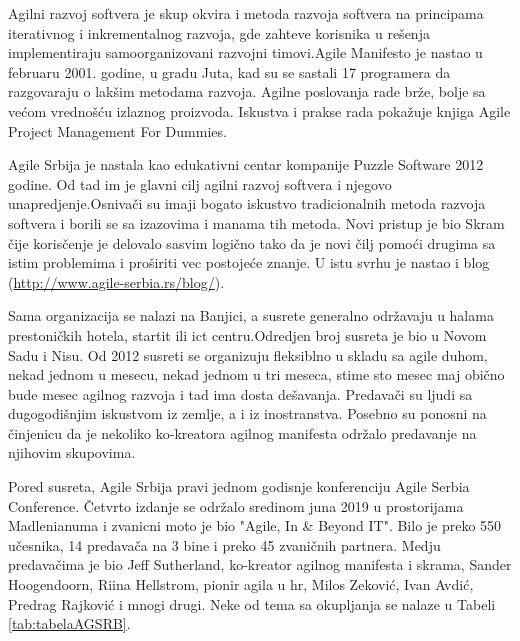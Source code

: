 \documentclass[a4paper]{article}
\begin{document}
{Agilni razvoj softvera je skup okvira i metoda razvoja softvera na principama iterativnog i inkrementalnog razvoja, gde zahteve korisnika u rešenja implementiraju samoorganizovani razvojni timovi.Agile Manifesto je nastao u februaru 2001. godine, u gradu Juta, kad su se sastali 17 programera da razgovaraju o lakšim metodama razvoja. \cite{agileManifes} Agilne poslovanja rade brže, bolje sa većom vrednošću izlaznog proizvoda. Iskustva i prakse rada pokažuje knjiga Agile Project Management For Dummies. \cite{agilebook} 

Agile Srbija je nastala kao edukativni centar kompanije Puzzle Software 2012 godine. Od tad im je glavni cilj agilni razvoj softvera i njegovo unapredjenje.Osnivači su imaji bogato iskustvo tradicionalnih metoda razvoja softvera i borili se sa izazovima i manama tih metoda. Novi pristup je bio Skram čije korisčenje je delovalo sasvim logično tako da je novi čilj pomoći drugima sa istim problemima i proširiti vec postojeće znanje. U istu svrhu je nastao i blog (\url{http://www.agile-serbia.rs/blog/}).

Sama organizacija se nalazi na Banjici, a susrete generalno održavaju u halama prestoničkih hotela, startit ili ict centru.Odredjen broj susreta je bio u Novom Sadu i Nisu. Od 2012 susreti se organizuju fleksiblno u skladu sa agile duhom, nekad jednom u mesecu, nekad jednom u tri meseca, stime sto mesec maj obično bude mesec agilnog razvoja i tad ima dosta dešavanja. Predavači su ljudi sa dugogodišnjim iskustvom iz zemlje, a i iz inostranstva. Posebno su ponosni na činjenicu da je nekoliko ko-kreatora agilnog manifesta održalo predavanje na njihovim skupovima. 

Pored susreta, Agile Srbija pravi jednom godisnje konferenciju Agile Serbia Conference. Četvrto izdanje se održalo sredinom juna 2019 u prostorijama Madlenianuma i zvanicni moto je bio "Agile, In \& Beyond IT". Bilo je preko 550 učesnika, 14 predavača na 3 bine i preko 45 zvaničnih partnera. Medju predavačima je bio Jeff Sutherland, ko-kreator agilnog manifesta i skrama, Sander Hoogendoorn, Riina Hellstrom, pionir agila u hr, Milos Zeković, Ivan Avdić, Predrag Rajković i mnogi drugi.
Neke od tema sa okupljanja se nalaze u Tabeli \ref{tab:tabelaAGSRB}. \\

}
\end{document}
